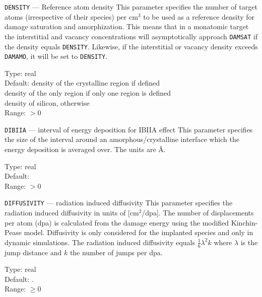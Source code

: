 \begin{keydescription}{\texttt{DENSITY} --- Reference atom density}
%
  This parameter specifies the number of target atoms (irrespective of
  their species) per cm$^3$ to be used as a reference density for damage
  saturation and amorphization.  This means that in a monatomic target the
  interstitial and vacancy concentrations will asymptotically approach
  \texttt{DAMSAT} if the density equals \texttt{DENSITY}.  Likewise, if the
  interstitial or vacancy density exceeds \texttt{DAMAMO}, it will be set to
  \texttt{DENSITY}.
  \begin{keytab}
    Type:    \> real \\
    Default: \> density of the crystalline region if defined \\ 
             \> density of the only region if only one region is defined \\
             \> density of silicon, otherwise \\
    Range:   \> $> 0$
  \end{keytab}
\end{keydescription}

\begin{keydescription}{\texttt{DIBIIA} --- interval of energy
    deposition for IBIIA effect}
%
  This parameter specifies the size of the interval around an
  amorphous/crystalline interface which the energy deposition is
  averaged over. The units are \AA.
  \begin{keytab}
    Type:    \> real \\
    Default:  \\
    Range:   \> $> 0$ 
  \end{keytab}
\end{keydescription}

\ifprivate
\begin{keydescription}{\texttt{DIFFUSIVITY} --- radiation induced diffusivity}
%
  This parameter specifies the radiation induced diffusivity in units of 
  [cm$^2$/dpa]. The number of displacements per atom (dpa) is calculated from 
  the damage energy using the modified Kinchin-Pease model. Diffusivity is 
  only considered for the implanted species and only in dynamic simulations. 
  The radiation induced diffusivity equals $\frac{1}{6}\lambda^2 k$ 
  where $\lambda$ is the jump distance and $k$ the number of jumps per dpa.
  \begin{keytab}
    Type:    \> real \\
    Default: . \\
    Range:   \> $\ge 0$ 
  \end{keytab}
\end{keydescription}
\fi

